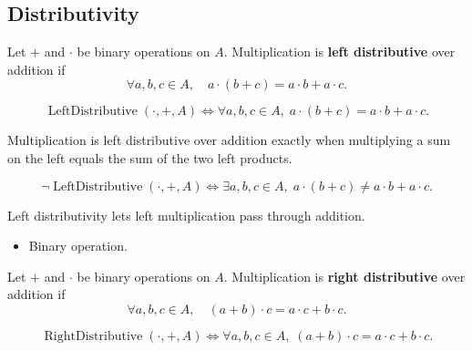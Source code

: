 \subsection{Distributivity}
\label{subsec:distributivity}

\begin{definition}
\label{def:left-distributivity}
Let $+$ and $\cdot$ be binary operations on $A$.
Multiplication is \textbf{left distributive} over addition if
\[
\forall a,b,c \in A,\quad
a\cdot(b+c)=a\cdot b+a\cdot c.
\]
\end{definition}

\begin{remark*}
\[
\operatorname{LeftDistributive}(\cdot,+,A)
\Longleftrightarrow
\forall a,b,c\in A,\; a\cdot(b+c)=a\cdot b+a\cdot c.
\]
\end{remark*}

\begin{remark*}
Multiplication is left distributive over addition exactly when multiplying a
sum on the left equals the sum of the two left products.
\end{remark*}

\begin{remark*}
\[
\neg\operatorname{LeftDistributive}(\cdot,+,A)
\Longleftrightarrow
\exists a,b,c\in A,\; a\cdot(b+c)\neq a\cdot b+a\cdot c.
\]
\end{remark*}

\begin{remark*}[Interpretation]
Left distributivity lets left multiplication pass through addition.
\end{remark*}

\begin{remark*}[Dependencies]
\begin{itemize}
  \item Binary operation.
\end{itemize}
\end{remark*}

\begin{definition}
\label{def:right-distributivity}
Let $+$ and $\cdot$ be binary operations on $A$.
Multiplication is \textbf{right distributive} over addition if
\[
\forall a,b,c \in A,\quad
(a+b)\cdot c=a\cdot c+b\cdot c.
\]
\end{definition}

\begin{remark*}
\[
\operatorname{RightDistributive}(\cdot,+,A)
\Longleftrightarrow
\forall a,b,c\in A,\; (a+b)\cdot c=a\cdot c+b\cdot c.
\]
\end{remark*}


